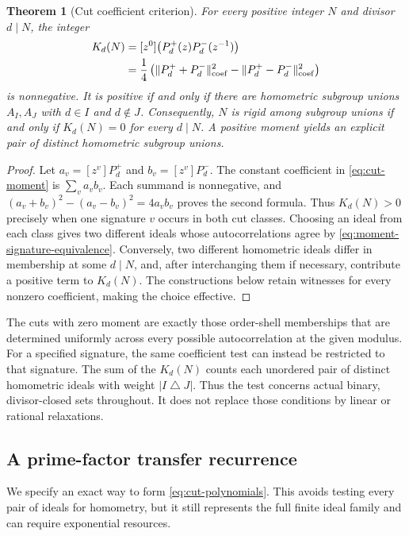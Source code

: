 \documentclass[11pt]{article}
\numberwithin{equation}{section}
\newtheorem{theorem}{Theorem}[section]
\theoremstyle{definition}
\theoremstyle{remark}
\begin{document}
\begin{theorem}[Cut coefficient criterion]\label{thm:cut-coefficient}
For every positive integer $N$ and divisor $d\mid N$, the integer
\begin{align}
 K_d(N)&=[z^0]\bigl(P_d^+(z)P_d^-(z^{-1})\bigr)\label{eq:cut-moment}\\
 &=\frac14\left(
 \|P_d^++P_d^-\|_{\mathrm{coef}}^2-
 \|P_d^+-P_d^-\|_{\mathrm{coef}}^2\right)\notag
\end{align}
is nonnegative.  It is positive if and only if there are homometric subgroup
unions $A_I,A_J$ with $d\in I$ and $d\notin J$.  Consequently, $N$ is rigid
among subgroup unions if and only if $K_d(N)=0$ for every $d\mid N$.
A positive moment yields an explicit pair of distinct homometric subgroup
unions.
\end{theorem}
\begin{proof}
Let $a_v=[z^v]P_d^+$ and $b_v=[z^v]P_d^-$.  The constant coefficient in
\eqref{eq:cut-moment} is $\sum_v a_vb_v$.  Each summand is nonnegative,
and $(a_v+b_v)^2-(a_v-b_v)^2=4a_vb_v$ proves the second formula.
Thus $K_d(N)>0$ precisely when one signature $v$ occurs in both cut classes.
Choosing an ideal from each class gives two different ideals whose
autocorrelations agree by \eqref{eq:moment-signature-equivalence}.
Conversely, two different homometric ideals differ in membership at some
$d\mid N$, and, after interchanging them if necessary, contribute a positive
term to $K_d(N)$.  The constructions below retain witnesses for every
nonzero coefficient, making the choice effective.
\end{proof}

The cuts with zero moment are exactly those order-shell memberships that are determined uniformly across every possible autocorrelation at the given modulus. For a specified signature, the same coefficient test can instead be restricted to that signature.  The sum of
the $K_d(N)$ counts each unordered pair of distinct homometric ideals with
weight $|I\mathbin\triangle J|$.  Thus the test concerns actual binary,
divisor-closed sets throughout.  It does not replace those conditions by
linear or rational relaxations.

\subsection{A prime-factor transfer recurrence}

We specify an exact way to form \eqref{eq:cut-polynomials}.  This avoids
testing every pair of ideals for homometry, but it still represents the full
finite ideal family and can require exponential resources.
\end{document}
